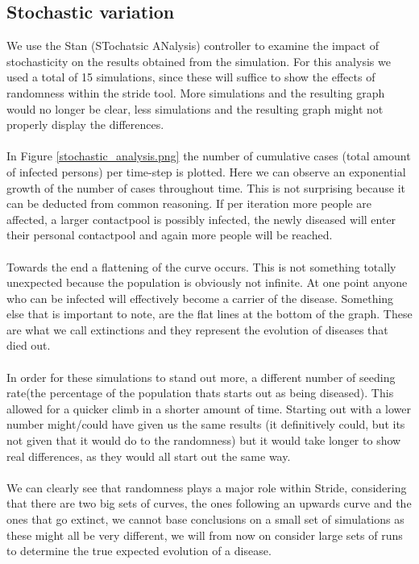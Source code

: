 \documentclass[runningheads]{llncs}
\begin{document}
	\subsection{Stochastic variation}
	We use the Stan (STochatsic ANalysis) controller to examine the impact of stochasticity on the results obtained from the simulation. For this analysis we used a total of 15 simulations, since these will suffice to show the effects of randomness within the stride tool. More simulations and the resulting graph would no longer be clear, less simulations and the resulting graph might not properly display the differences.\\ 
	\\
	In Figure \ref{stochastic_analysis.png} the number of cumulative cases (total amount of infected persons) per time-step is plotted. Here we can observe an exponential growth of the number of cases throughout time. This is not surprising because it can be deducted from common reasoning. If per iteration more people are affected, a larger contactpool is possibly infected, the newly diseased will enter their personal contactpool and again more people will be reached.\\ 
	\\
	Towards the end a flattening of the curve occurs. This is not something totally unexpected because the population is obviously not infinite. At one point anyone who can be infected will effectively become a carrier of the disease. Something else that is important to note, are the flat lines at the bottom of the graph. These are what we call extinctions and they represent the evolution of diseases that died out.\\ 
	\\
	In order for these simulations to stand out more, a different number of seeding rate(the percentage of the population thats starts out as being diseased). This allowed for a quicker climb in a shorter amount of time. Starting out with a lower number might/could have given us the same results (it definitively could, but its not given that it would do to the randomness) but it would take longer to show real differences, as they would all start out the same way.\\
	\\
	We can clearly see that randomness plays a major role within Stride, considering that there are two big sets of curves, the ones following an upwards curve and the ones that go extinct, we cannot base conclusions on a small set of simulations as these might all be very different, we will from now on consider large sets of runs to determine the true expected evolution of a disease.\\
	
\end{document}
